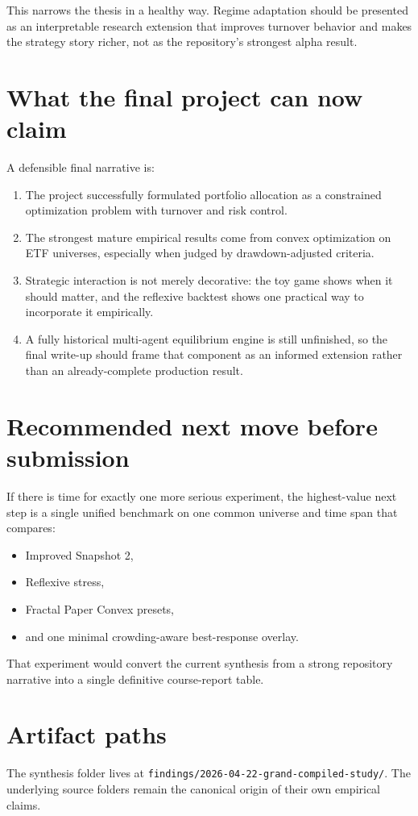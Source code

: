 \documentclass[11pt,a4paper]{article}
\begin{document}
This narrows the thesis in a healthy way. Regime adaptation should be presented as an interpretable research extension that improves turnover behavior and makes the strategy story richer, not as the repository's strongest alpha result.

\section{What the final project can now claim}
A defensible final narrative is:
\begin{enumerate}
    \item The project successfully formulated portfolio allocation as a constrained optimization problem with turnover and risk control.
    \item The strongest mature empirical results come from convex optimization on ETF universes, especially when judged by drawdown-adjusted criteria.
    \item Strategic interaction is not merely decorative: the toy game shows when it should matter, and the reflexive backtest shows one practical way to incorporate it empirically.
    \item A fully historical multi-agent equilibrium engine is still unfinished, so the final write-up should frame that component as an informed extension rather than an already-complete production result.
\end{enumerate}

\section{Recommended next move before submission}
If there is time for exactly one more serious experiment, the highest-value next step is a single unified benchmark on one common universe and time span that compares:
\begin{itemize}[noitemsep]
    \item Improved Snapshot 2,
    \item Reflexive stress,
    \item Fractal Paper Convex presets,
    \item and one minimal crowding-aware best-response overlay.
\end{itemize}
That experiment would convert the current synthesis from a strong repository narrative into a single definitive course-report table.

\section*{Artifact paths}
The synthesis folder lives at \texttt{findings/2026-04-22-grand-compiled-study/}. The underlying source folders remain the canonical origin of their own empirical claims.
\end{document}
